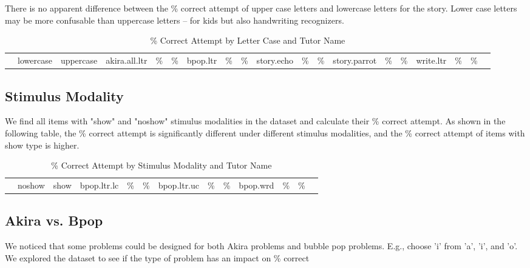 \documentclass[hyperref]{ctexart}
\begin{document}
\begin{multicols}{2}
There is no apparent difference between the \% correct attempt of upper case letters and lowercase letters for the story. Lower case letters may be more confusable than uppercase letters -- for kids but also handwriting recognizers.

\begin{table}[H]
  \begin{tabular}{lll}
    \hline{}
    &\quad lowercase\quad\quad& uppercase\quad\quad&
    \hline
    akira.all.ltr&  \quad {}\%& \%& 
    bpop.ltr&       \quad {}\%& \%&
    story.echo&     \quad {}\%& \%&
    story.parrot&   \quad {}\%& \%&
    write.ltr&      \quad {}\%& \%&
    \hline{}
  \end{tabular}
  \caption{\% Correct Attempt by Letter Case and Tutor Name}
\end{table}

\subsection{Stimulus Modality}
We find all items with "show" and "noshow" stimulus modalities in the dataset and calculate their \% correct attempt. As shown in the following table, the \% correct attempt is significantly different under different stimulus modalities, and the \% correct attempt of items with show type is higher.
\begin{table}[H]
  \begin{tabular}{lll}
    \hline{}
    &\quad\quad noshow\quad\quad&\quad\quad show\quad\quad\quad&
    \hline
    bpop.ltr.lc&       \quad\quad {}\%& \quad{}\%&
    bpop.ltr.uc&       \quad\quad {}\%& \quad{}\%&
    bpop.wrd&          \quad\quad {}\%& \quad{}\%&
    \hline{}
  \end{tabular}
  \caption{\% Correct Attempt by Stimulus Modality and Tutor Name}
\end{table}

\subsection{Akira vs. Bpop}
We noticed that some problems could be designed for both Akira problems and bubble pop problems. E.g., choose 'i' from 'a', 'i', and 'o'. We explored the dataset to see if the type of problem has an impact on \% correct
 

\end{multicols}
\end{document}

